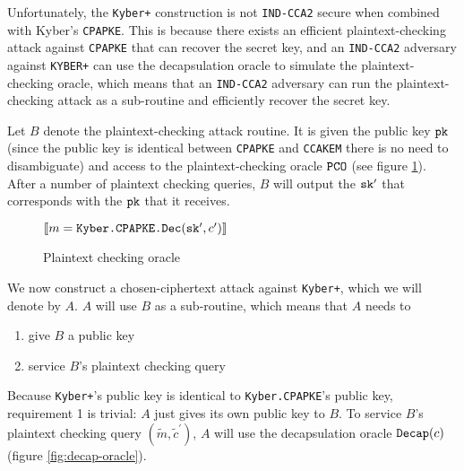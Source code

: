 \documentclass{article}
\begin{document}
Unfortunately, the \texttt{Kyber+} construction is not \texttt{IND-CCA2} secure when combined with Kyber's \texttt{CPAPKE}. This is because there exists an efficient plaintext-checking attack against \texttt{CPAPKE} that can recover the secret key, and an \texttt{IND-CCA2} adversary against \texttt{KYBER+} can use the decapsulation oracle to simulate the plaintext-checking oracle, which means that an \texttt{IND-CCA2} adversary can run the plaintext-checking attack as a sub-routine and efficiently recover the secret key.

Let $B$ denote the plaintext-checking attack routine. It is given the public key $\texttt{pk}$ (since the public key is identical between \texttt{CPAPKE} and \texttt{CCAKEM} there is no need to disambiguate) and access to the plaintext-checking oracle $\texttt{PCO}$ (see figure \ref{fig:pco}). After a number of plaintext checking queries, $B$ will output the $\texttt{sk}^\prime$ that corresponds with the $\texttt{pk}$ that it receives.

\begin{figure}[H]
    \centering
    \begin{minipage}{0.5\textwidth}
        \begin{algorithm}[H]
            \caption{$\pco(m, c^\prime)$}\label{alg:pco}
            \begin{algorithmic}
                \State \Return $[\![ m = \texttt{Kyber.CPAPKE.Dec}(
                    \texttt{sk}^\prime, c^\prime)]\!]$
            \end{algorithmic}
        \end{algorithm}
    \end{minipage}
    \caption{Plaintext checking oracle}\label{fig:pco}
\end{figure}

We now construct a chosen-ciphertext attack against \texttt{Kyber+}, which we will denote by $A$. $A$ will use $B$ as a sub-routine, which means that $A$ needs to \begin{enumerate}
    \item give $B$ a public key
    \item service $B$'s plaintext checking query
\end{enumerate}

Because \texttt{Kyber+}'s public key is identical to \texttt{Kyber.CPAPKE}'s public key, requirement 1 is trivial: $A$ just gives its own public key to $B$. To service $B$'s plaintext checking query $(\tilde{m}, \tilde{c}^\prime)$, $A$ will use the decapsulation oracle $\texttt{Decap}(c)$ (figure \ref{fig:decap-oracle}).
\end{document}
